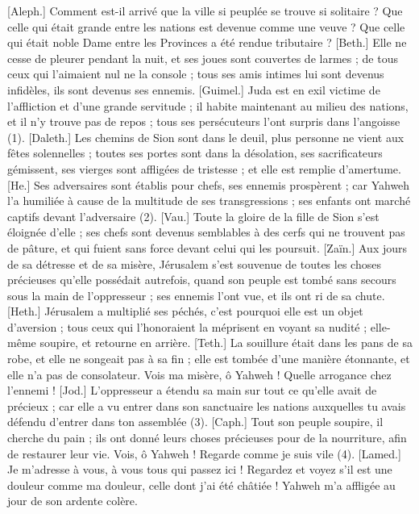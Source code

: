 \BFont
\begin{multicols}{2}
\VerseOne{}[Aleph.] Comment est-il arrivé que la ville si peuplée se trouve si solitaire ? Que celle qui était grande entre les nations est devenue comme une veuve ? Que celle qui était noble Dame entre les Provinces a été rendue tributaire ?
[Beth.] Elle ne cesse de pleurer pendant la nuit, et ses joues sont couvertes de larmes ; de tous ceux qui l'aimaient nul ne la console ; tous ses amis intimes lui sont devenus infidèles, ils sont devenus ses ennemis.
[Guimel.] Juda est en exil victime de l'affliction et d'une grande servitude ; il habite maintenant au milieu des nations, et il n’y trouve pas de repos ; tous ses persécuteurs l'ont surpris dans l'angoisse (1).
[Daleth.] Les chemins de Sion sont dans le deuil, plus personne ne vient aux fêtes solennelles ; toutes ses portes sont dans la désolation, ses sacrificateurs gémissent, ses vierges sont affligées de tristesse ; et elle est remplie d'amertume.
[He.] Ses adversaires sont établis pour chefs, ses ennemis prospèrent ; car Yahweh l'a humiliée à cause de la multitude de ses transgressions ; ses enfants ont marché captifs devant l'adversaire (2).
[Vau.] Toute la gloire de la fille de Sion s'est éloignée d'elle ; ses chefs sont devenus semblables à des cerfs qui ne trouvent pas de pâture, et qui fuient sans force devant celui qui les poursuit.
[Zaïn.] Aux jours de sa détresse et de sa misère, Jérusalem s’est souvenue de toutes les choses précieuses qu’elle possédait autrefois, quand son peuple est tombé sans secours sous la main de l’oppresseur ; ses ennemis l’ont vue, et ils ont ri de sa chute.
[Heth.] Jérusalem a multiplié ses péchés, c'est pourquoi elle est un objet d'aversion ; tous ceux qui l'honoraient la méprisent en voyant sa nudité ; elle-même soupire, et retourne en arrière.
[Teth.] La souillure était dans les pans de sa robe, et elle ne songeait pas à sa fin ; elle est tombée d'une manière étonnante, et elle n'a pas de consolateur. Vois ma misère, ô Yahweh ! Quelle arrogance chez l'ennemi !
[Jod.] L’oppresseur a étendu sa main sur tout ce qu’elle avait de précieux ; car elle a vu entrer dans son sanctuaire les nations auxquelles tu avais défendu d’entrer dans ton assemblée (3).
[Caph.] Tout son peuple soupire, il cherche du pain ; ils ont donné leurs choses précieuses pour de la nourriture, afin de restaurer leur vie. Vois, ô Yahweh ! Regarde comme je suis vile (4).
[Lamed.] Je m'adresse à vous, à vous tous qui passez ici ! Regardez et voyez s'il est une douleur comme ma douleur, celle dont j'ai été châtiée ! Yahweh m'a affligée au jour de son ardente colère.

\end{multicols}
